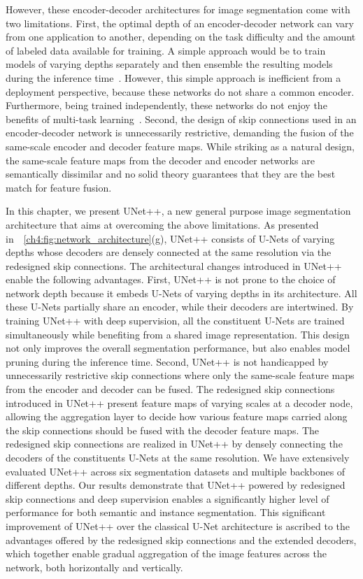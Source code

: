 However, these encoder-decoder architectures for image segmentation come with two limitations. First, the optimal depth of an encoder-decoder network can vary from one application to another, depending on the task difficulty and the amount of labeled data available for training. A simple approach would be to train models of varying depths separately and then ensemble the resulting models during the inference time~\citep{dietterich2000ensemble,hoo2016deep,ciompi2015automatic}. However, this simple approach is inefficient from a deployment perspective, because these networks do not share a common encoder. Furthermore, being trained independently, these networks do not enjoy the benefits of multi-task learning~\citep{bengio2009learning,zhang2017survey}.
Second, the design of skip connections used in an encoder-decoder network is unnecessarily restrictive, demanding the fusion of the same-scale encoder and decoder feature maps. While striking as a natural design,  the same-scale feature maps from the decoder and encoder networks are semantically dissimilar and no solid theory guarantees that they are the best match for feature fusion. 



In this chapter, we present UNet++, a new general purpose image segmentation architecture that aims at overcoming the above limitations. As presented in~\figurename~\ref{ch4:fig:network_architecture}(g), UNet++ consists of U-Nets of varying depths whose decoders are densely connected at the same resolution via the redesigned skip connections. The architectural changes introduced in UNet++ enable the following advantages. First, UNet++ is not prone to the choice of network depth because it embeds U-Nets of varying depths in its architecture. All these U-Nets partially share an encoder, while their decoders are intertwined. By training UNet++ with deep supervision, all the constituent U-Nets are trained simultaneously while benefiting from a shared image representation. This design not only improves the overall segmentation performance, but also enables model pruning during the inference time. Second, UNet++ is not handicapped by unnecessarily restrictive skip connections where only the same-scale feature maps from the encoder and decoder can be fused. The redesigned skip connections introduced in  UNet++ present feature maps of varying scales at a decoder node, allowing the aggregation layer to decide how various feature maps carried along the skip connections should be fused with the decoder feature maps. The redesigned skip connections are realized in UNet++ by densely connecting the decoders of the constituents U-Nets at the same resolution.
We have extensively evaluated UNet++ across six segmentation datasets and multiple backbones of different depths. Our results demonstrate that UNet++ powered by redesigned skip connections and deep supervision enables a significantly higher level of performance for both semantic and instance segmentation. 
This significant improvement of UNet++ over the classical U-Net architecture is ascribed to the advantages offered by the redesigned skip connections and the extended decoders, which together enable gradual aggregation of the image features  across the network, both horizontally and vertically.

